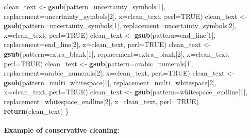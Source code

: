 \documentclass[]{article}
\newenvironment{Shaded}{\begin{snugshade}}{\end{snugshade}}
\newcommand{\DataTypeTok}[1]{\textcolor[rgb]{0.13,0.29,0.53}{#1}}
\newcommand{\DecValTok}[1]{\textcolor[rgb]{0.00,0.00,0.81}{#1}}
\newcommand{\KeywordTok}[1]{\textcolor[rgb]{0.13,0.29,0.53}{\textbf{#1}}}
\newcommand{\NormalTok}[1]{#1}
\newcommand{\OtherTok}[1]{\textcolor[rgb]{0.56,0.35,0.01}{#1}}
\newcommand{\StringTok}[1]{\textcolor[rgb]{0.31,0.60,0.02}{#1}}
\let\oldparagraph\paragraph
\renewcommand{\paragraph}[1]{\oldparagraph{#1}\mbox{}}
\begin{document}
\begin{Shaded}
\begin{Highlighting}[]
\NormalTok{  clean_text <-}\StringTok{ }\KeywordTok{gsub}\NormalTok{(}\DataTypeTok{pattern=}\NormalTok{uncertainty_symbols[}\DecValTok{1}\NormalTok{], }\DataTypeTok{replacement=}\NormalTok{uncertainty_symbols[}\DecValTok{2}\NormalTok{], }\DataTypeTok{x=}\NormalTok{clean_text, }\DataTypeTok{perl=}\OtherTok{TRUE}\NormalTok{)}
\NormalTok{  clean_text <-}\StringTok{ }\KeywordTok{gsub}\NormalTok{(}\DataTypeTok{pattern=}\NormalTok{uncertainty_symbols[}\DecValTok{1}\NormalTok{], }\DataTypeTok{replacement=}\NormalTok{uncertainty_symbols[}\DecValTok{2}\NormalTok{], }\DataTypeTok{x=}\NormalTok{clean_text, }\DataTypeTok{perl=}\OtherTok{TRUE}\NormalTok{)}
\NormalTok{  clean_text <-}\StringTok{ }\KeywordTok{gsub}\NormalTok{(}\DataTypeTok{pattern=}\NormalTok{end_line[}\DecValTok{1}\NormalTok{], }\DataTypeTok{replacement=}\NormalTok{end_line[}\DecValTok{2}\NormalTok{], }\DataTypeTok{x=}\NormalTok{clean_text, }\DataTypeTok{perl=}\OtherTok{TRUE}\NormalTok{)}
\NormalTok{  clean_text <-}\StringTok{ }\KeywordTok{gsub}\NormalTok{(}\DataTypeTok{pattern=}\NormalTok{extra_blank[}\DecValTok{1}\NormalTok{], }\DataTypeTok{replacement=}\NormalTok{extra_blank[}\DecValTok{2}\NormalTok{], }\DataTypeTok{x=}\NormalTok{clean_text, }\DataTypeTok{perl=}\OtherTok{TRUE}\NormalTok{)}
\NormalTok{  clean_text <-}\StringTok{ }\KeywordTok{gsub}\NormalTok{(}\DataTypeTok{pattern=}\NormalTok{arabic_numerals[}\DecValTok{1}\NormalTok{], }\DataTypeTok{replacement=}\NormalTok{arabic_numerals[}\DecValTok{2}\NormalTok{], }\DataTypeTok{x=}\NormalTok{clean_text, }\DataTypeTok{perl=}\OtherTok{TRUE}\NormalTok{)}
\NormalTok{  clean_text <-}\StringTok{ }\KeywordTok{gsub}\NormalTok{(}\DataTypeTok{pattern=}\NormalTok{multi_whitespace[}\DecValTok{1}\NormalTok{], }\DataTypeTok{replacement=}\NormalTok{multi_whitespace[}\DecValTok{2}\NormalTok{], }\DataTypeTok{x=}\NormalTok{clean_text, }\DataTypeTok{perl=}\OtherTok{TRUE}\NormalTok{)}
\NormalTok{  clean_text <-}\StringTok{ }\KeywordTok{gsub}\NormalTok{(}\DataTypeTok{pattern=}\NormalTok{whitespace_endline[}\DecValTok{1}\NormalTok{], }\DataTypeTok{replacement=}\NormalTok{whitespace_endline[}\DecValTok{2}\NormalTok{], }\DataTypeTok{x=}\NormalTok{clean_text, }\DataTypeTok{perl=}\OtherTok{TRUE}\NormalTok{)}
      \KeywordTok{return}\NormalTok{(clean_text)}
\NormalTok{\}}
\end{Highlighting}
\end{Shaded}

\hypertarget{example-of-conservative-cleaning}{%
\paragraph{Example of conservative
cleaning:}\label{example-of-conservative-cleaning}}
\end{document}
